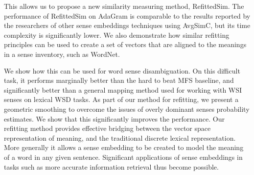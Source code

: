 {This allows us to propose a new similarity measuring method, RefittedSim.
The performance of RefittedSim on AdaGram is comparable to the results reported by the researchers of other sense embeddings techniques using AvgSimC, but its time complexity is significantly lower.
We also demonstrate how similar refitting principles can be used to create a set of vectors that are aligned to the meanings in a sense inventory, such as WordNet.

We show how this can be used for word sense disambiguation.
On this difficult task, it performs marginally better than the hard to beat MFS baseline, and significantly better than a general mapping method used for working with WSI senses on lexical WSD tasks.
As part of our method for refitting, we present a geometric smoothing to overcome the issues of overly dominant senses probability estimates.
We show that this significantly improves the performance.
Our refitting method provides effective bridging between the vector space representation of meaning, and the traditional discrete lexical representation.
More generally it allows a sense embedding to be created to model the meaning of a word in any given sentence.
Significant applications  of sense embeddings in tasks such as more accurate information retrieval thus become possible.

}
%
